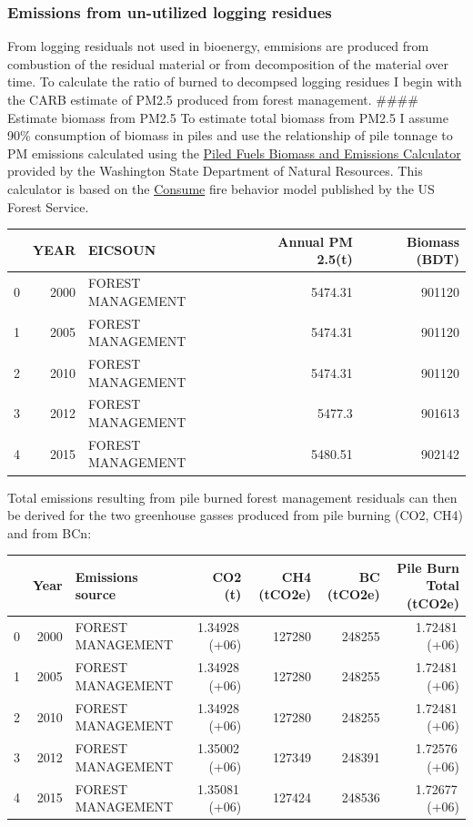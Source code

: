 \documentclass[a4paper]{article}
\begin{document}
\subsubsection{Emissions from un-utilized logging residues}
\label{sec:orgheadline8}

From logging residuals not used in bioenergy, emmisions are produced
from combustion of the residual material or from decomposition of the
material over time. To calculate the ratio of burned to decompsed
logging residues I begin with the CARB estimate of PM2.5 produced from
forest management. \#\#\#\# Estimate biomass from PM2.5 To estimate total
biomass from PM2.5 I assume 90\% consumption of biomass in piles and use
the relationship of pile tonnage to PM emissions calculated using the
\href{http://depts.washington.edu/nwfire/piles/}{Piled Fuels Biomass and
Emissions Calculator} provided by the Washington State Department of
Natural Resources. This calculator is based on the
\href{http://www.fs.fed.us/pnw/fera/research/smoke/consume/index.shtml}{Consume}
fire behavior model published by the US Forest Service.

\begin{center}
\begin{tabular}{rrlrr}
 & YEAR & EICSOUN & Annual PM 2.5(t) & Biomass (BDT)\\
\hline
0 & 2000 & FOREST MANAGEMENT & 5474.31 & 901120\\
1 & 2005 & FOREST MANAGEMENT & 5474.31 & 901120\\
2 & 2010 & FOREST MANAGEMENT & 5474.31 & 901120\\
3 & 2012 & FOREST MANAGEMENT & 5477.3 & 901613\\
4 & 2015 & FOREST MANAGEMENT & 5480.51 & 902142\\
\end{tabular}

\end{center}

Total emissions resulting from pile burned forest management residuals
can then be derived for the two greenhouse gasses produced from pile
burning (CO2, CH4) and from BCn:

\begin{center}
\begin{tabular}{rrlrrrr}
 & Year & Emissions source & CO2 (t) & CH4 (tCO2e) & BC (tCO2e) & Pile Burn Total (tCO2e)\\
\hline
0 & 2000 & FOREST MANAGEMENT & 1.34928\,(+06) & 127280 & 248255 & 1.72481\,(+06)\\
1 & 2005 & FOREST MANAGEMENT & 1.34928\,(+06) & 127280 & 248255 & 1.72481\,(+06)\\
2 & 2010 & FOREST MANAGEMENT & 1.34928\,(+06) & 127280 & 248255 & 1.72481\,(+06)\\
3 & 2012 & FOREST MANAGEMENT & 1.35002\,(+06) & 127349 & 248391 & 1.72576\,(+06)\\
4 & 2015 & FOREST MANAGEMENT & 1.35081\,(+06) & 127424 & 248536 & 1.72677\,(+06)\\
\end{tabular}

\end{center}
\end{document}
